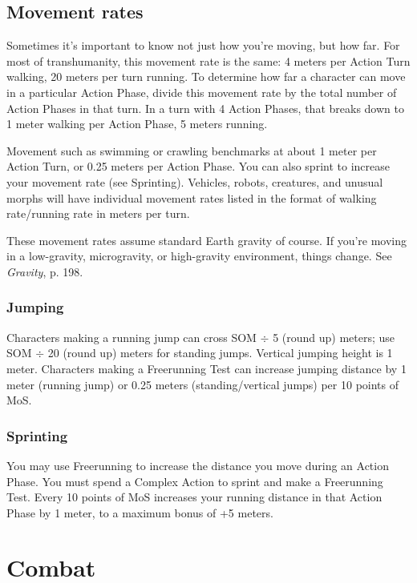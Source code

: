 \subsection{Movement rates}
\label{sec:movement-rates}

Sometimes it’s important to know not just how you’re moving, but how far. For most of transhumanity, this movement rate is the same: 4 meters per Action Turn walking, 20 meters per turn running. To determine how far a character can move in a particular Action Phase, divide this movement rate by the total number of Action Phases in that turn. In a turn with 4 Action Phases, that breaks down to 1 meter walking per Action Phase, 5 meters running.

Movement such as swimming or crawling benchmarks at about 1 meter per Action Turn, or 0.25 meters per Action Phase. You can also sprint to increase your movement rate (see Sprinting). Vehicles, robots, creatures, and unusual morphs will have individual movement rates listed in the format of walking rate/running rate in meters per turn.

These movement rates assume standard Earth gravity of course. If you’re moving in a low-gravity, microgravity, or high-gravity environment, things change. See \emph{Gravity}, p. 198.


\subsubsection{Jumping}

Characters making a running jump can cross SOM $\div$ 5 (round up) meters; use SOM $\div$ 20 (round up) meters for standing jumps. Vertical jumping height is 1 meter. Characters making a Freerunning Test can increase jumping distance by 1 meter (running jump) or 0.25 meters (standing/vertical jumps) per 10 points of MoS.

\subsubsection{Sprinting}

You may use Freerunning to increase the distance you move during an Action Phase. You must spend a Complex Action to sprint and make a Freerunning Test. Every 10 points of MoS increases your running distance in that Action Phase by 1 meter, to a maximum bonus of +5 meters.


\section{Combat}
\label{sec:combat}

